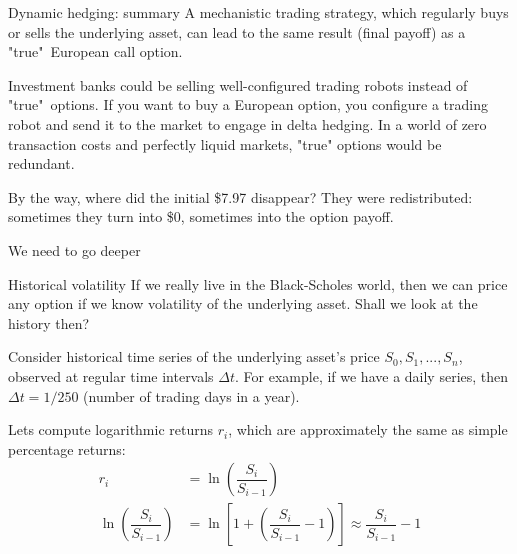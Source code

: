 \documentclass{beamer}
\begin{document}
\begin{frame}{Dynamic hedging: summary}
\justify
A mechanistic trading strategy, which regularly buys or sells the underlying asset, can lead to the same result (final payoff) as a "true"\ European call option.

\justify
Investment banks could be selling well-configured trading robots instead of "true"\ options. If you want to buy a European option, you configure a trading robot and send it to the market to engage in delta hedging. In a world of zero transaction costs and perfectly liquid markets, "true" options would be redundant.

\justify
By the way, where did the initial \$7.97 disappear? They were redistributed: sometimes they turn into \$0, sometimes into the option payoff.
\end{frame}



\begin{frame}{We need to go deeper}
\centering
{}
\end{frame}



\begin{frame}{Historical volatility}
\justify
If we really live in the Black-Scholes world, then we can price any option if we know volatility of the underlying asset. Shall we look at the history then?

\justify
Consider historical time series of the underlying asset's price $S_0,S_1,...,S_n$, observed at regular time intervals $\Delta t$. For example, if we have a daily series, then $\Delta t = 1/250$ (number of trading days in a year). 

\justify
Lets compute logarithmic returns $r_i$, which are approximately the same as simple percentage returns:
\begin{align*}
r_i &= \ln \left( \dfrac{S_{i}}{S_{i-1}} \right) \\
\ln \left(\dfrac{S_{i}}{S_{i-1}} \right) &= \ln \left[1 + \left(\dfrac{S_{i}}{S_{i-1}} - 1 \right) \right] \approx \dfrac{S_{i}}{S_{i-1}} - 1
\end{align*}
\end{frame}
\end{document}
